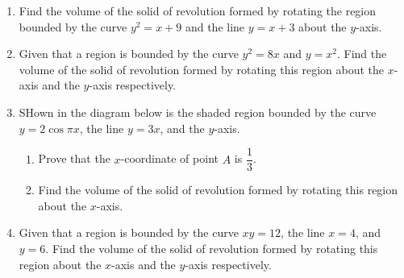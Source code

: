 \documentclass{report}
\begin{document}
\begin{enumerate}
    \item Find the volume of the solid of revolution formed by rotating the region
          bounded by the curve $y^2=x+9$ and the line $y=x+3$ about the $y$-axis.
    \item Given that a region is bounded by the curve $y^2=8 x$ and $y=x^2$. Find the
          volume of the solid of revolution formed by rotating this region about the
          $x$-axis and the $y$-axis respectively.
    \item SHown in the diagram below is the shaded region bounded by the curve $y =
              2\cos\pi x$, the line $y = 3x$, and the $y$-axis.
          \begin{enumerate}
              \item Prove that the $x$-coordinate of point $A$ is $\dfrac{1}{3}$.
              \item Find the volume of the solid of revolution formed by rotating this region about
                    the $x$-axis.
          \end{enumerate}
    \item Given that a region is bounded by the curve $xy = 12$, the line $x = 4$, and $y
              = 6$. Find the volume of the solid of revolution formed by rotating this region
          about the $x$-axis and the $y$-axis respectively.
\end{enumerate}
\end{document}
